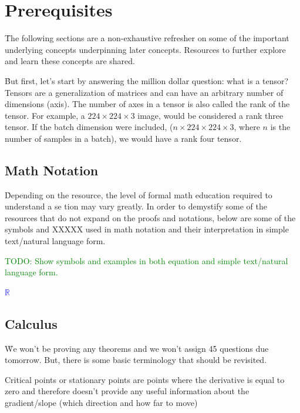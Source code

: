\chapter{Prerequisites}

\r{The following sections are a non-exhaustive refresher on some of the important underlying concepts underpinning later concepts. Resources to further explore and learn these concepts are shared.}

\r{But first, let's start by answering the million dollar question: what is a tensor?  {Tensors} are a generalization of matrices and can have an arbitrary number of dimensions (axis). The number of axes in a tensor is also called the {rank} of the tensor. For example, a $224\times224\times3$ image, would be considered a rank three tensor. If the batch dimension were included, ($n\times224\times224\times3$, where $n$ is the number of samples in a batch), we would have a rank four tensor.}


\section{Math Notation}

\r{Depending on the resource, the level of formal math education required to understand a se tion may vary greatly. In order to demystify some of the resources that do not expand on the proofs and notations, below are some of the symbols and XXXXX used in math notation and their interpretation in simple text/natural language form.}

\textcolor{green}{TODO: Show symbols and examples in both equation and simple text/natural language form.}

\textcolor{blue}{$\mathbb{R}$}

\section{Calculus}


\r{We won't be proving any theorems and we won't assign 45 questions due tomorrow. But, there is some basic terminology that should be revisited.}

\r{{Critical points} or {stationary points} are points where the derivative is equal to zero and therefore doesn't provide any useful information about the gradient/slope (which direction and how far to move)}

